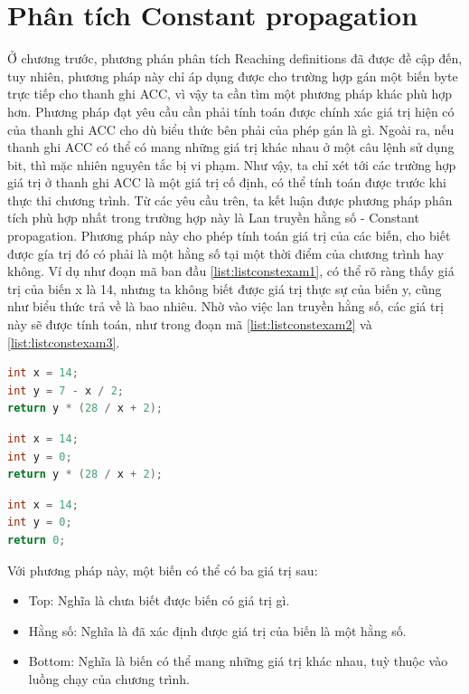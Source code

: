 \section{Phân tích Constant propagation}
Ở chương trước, phương phán phân tích Reaching definitions đã được đề cập đến, tuy nhiên, phương pháp này chỉ áp dụng được cho trường hợp gán một biến byte trực tiếp cho thanh ghi ACC, vì vậy ta cần tìm một phương pháp khác phù hợp hơn. Phương pháp đạt yêu cầu cần phải tính toán được chính xác giá trị hiện có của thanh ghi ACC cho dù biểu thức bên phải của phép gán là gì. Ngoài ra, nếu thanh ghi ACC có thể có mang những giá trị khác nhau ở một câu lệnh sử dụng bit, thì mặc nhiên nguyên tắc bị vi phạm. Như vậy, ta chỉ xét tới các trường hợp giá trị ở thanh ghi ACC là một giá trị cố định, có thể tính toán được trước khi thực thi chương trình. Từ các yêu cầu trên, ta kết luận được phương pháp phân tích phù hợp nhất trong trường hợp này là Lan truyền hằng số - Constant propagation. Phương pháp này cho phép tính toán giá trị của các biến, cho biết được gía trị đó có phải là một hằng số tại một thời điểm của chương trình hay không. Ví dụ như đoạn mã ban đầu \ref{list:listconstexam1}, có thể rõ ràng thấy giá trị của biến x là 14, nhưng ta không biết được giá trị thực sự của biến y, cũng như biểu thức trả về là bao nhiêu. Nhờ vào việc lan truyền hằng số, các giá trị này sẽ được tính toán, như trong đoạn mã \ref{list:listconstexam2} và \ref{list:listconstexam3}.
\begin{lstlisting}[caption={Đoạn mã trước khi thực hiện lan truyền hằng số},label={list:listconstexam1}, language=c++]
 int x = 14;
int y = 7 - x / 2;
return y * (28 / x + 2);
\end{lstlisting}
\begin{lstlisting}[caption={Đoạn mã sau khi thực hiện lan truyền hằng số cho biến y},label={list:listconstexam2}, language=c++]
int x = 14;
int y = 0;
return y * (28 / x + 2);
\end{lstlisting}
\begin{lstlisting}[caption={Đoạn mã sau khi thực hiện lan truyền hằng số cho biểu thức trả về},label={list:listconstexam3}, language=c++]
int x = 14;
int y = 0;
return 0;
\end{lstlisting}
Với phương pháp này, một biến có thể có ba giá trị sau:
\begin{itemize}
	\item Top: Nghĩa là chưa biết được biến có giá trị gì.
	\item Hằng số: Nghĩa là đã xác định được giá trị của biến là một hằng số.
	\item Bottom: Nghĩa là biến có thể mang những giá trị khác nhau, tuỳ thuộc vào luồng chạy của chương trình.
\end{itemize}

